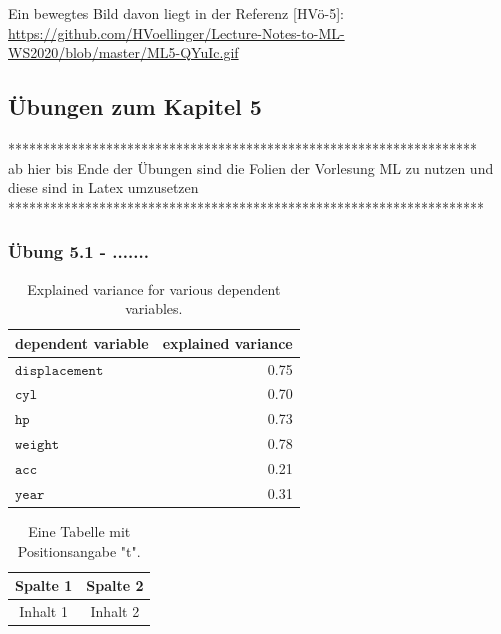 \documentclass[12pt]{article}
\begin{document}
Ein bewegtes Bild davon liegt in der Referenz [HVö-5]: 
\url{https://github.com/HVoellinger/Lecture-Notes-to-ML-WS2020/blob/master/ML5-QYuIc.gif}

\subsection{Übungen zum Kapitel 5}
{\color{red}
{*******************************************************************\\ 
ab hier bis Ende der Übungen sind die Folien der Vorlesung ML  zu nutzen und diese sind in Latex umzusetzen\\
********************************************************************\\}}



\subsubsection{Übung 5.1 - .......}
\begin{table}[h]
  \centering
  \begin{tabular}{|l|r|}
  \hline
  dependent variable      & explained variance   \\
  \hline
  \hline
  $\mathtt{displacement}$ & 0.75                 \\
  \hline
  $\mathtt{cyl}$          & 0.70                 \\
  \hline
  $\mathtt{hp}$           & 0.73                 \\
  \hline
  $\mathtt{weight}$       & 0.78                 \\
  \hline
  $\mathtt{acc}$          & 0.21                 \\
  \hline
  $\mathtt{year}$         & 0.31                 \\
  \hline
  \end{tabular}
  \caption[explained variance]{Explained variance for various dependent variables.}
  \label{tab:explained-variance}
\end{table}

\begin{table}[t] %
  \centering
  \begin{tabular}{|c|c|}
    \hline
    Spalte 1 & Spalte 2 \\
    \hline
    Inhalt 1 & Inhalt 2 \\
    \hline
  \end{tabular}
  \caption{Eine Tabelle mit Positionsangabe "t".}
  \label{tab:tabelle_t}
\end{table}
\end{document}
